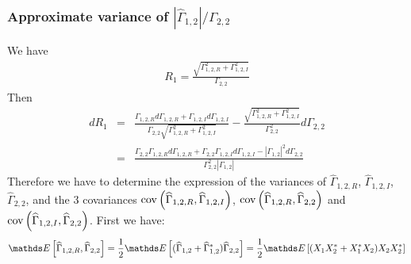 \subsubsection{Approximate variance of $|\hat\Gamma_{1,2}|/\Gamma_{2,2}$}
We have
\begin{eqnarray*}
 R_{1}=\frac{\sqrt{\Gamma_{1,2,R}^{2}+\Gamma_{1,2,I}^{2}}}{\Gamma_{2,2}}
\end{eqnarray*}
Then
\begin{eqnarray*}
  dR_{1} &=&
 \frac{\Gamma_{1,2,R}d\Gamma_{1,2,R}+\Gamma_{1,2,I}d\Gamma_{1,2,I}}
      {\Gamma_{2,2}\sqrt{\Gamma_{1,2,R}^{2}+\Gamma_{1,2,I}^{2}}}
      -\frac{\sqrt{\Gamma_{1,2,R}^{2}+\Gamma_{1,2,I}^{2}}}{\Gamma_{2,2}^{2}}d\Gamma_{2,2}
 \\
 &=&
  \frac{\Gamma_{2,2}\Gamma_{1,2,R}d\Gamma_{1,2,R}+\Gamma_{2,2}\Gamma_{1,2,I}d\Gamma_{1,2,I}
   -|\Gamma_{1,2}|^{2}d\Gamma_{2,2}}
      {\Gamma_{2,2}^{2}|\Gamma_{1,2}|}
\end{eqnarray*}
Therefore we have to determine the expression of the variances of $\hat\Gamma_{1,2,R}$, $\hat\Gamma_{1,2,I}$, $\hat\Gamma_{2,2}$, and the 3 covariances $\mathrm{cov}\left( \widehat\Gamma_{1,2,R},\widehat\Gamma_{1,2,I} \right)$, $\mathrm{cov}\left( \widehat\Gamma_{1,2,R},\widehat\Gamma_{2,2} \right)$
and
$\mathrm{cov}\left( \widehat\Gamma_{1,2,I},\widehat\Gamma_{2,2} \right)$. First we have:
\begin{eqnarray*}
 \esp{\hat\Gamma_{1,2,R},\hat\Gamma_{2,2}}
 =
 \frac{1}{2}\esp{(\hat\Gamma_{1,2}+\hat\Gamma_{1,2}^{*})\hat\Gamma_{2,2}}
 =
 \frac{1}{2}\esp{(X_{1}X_{2}^{*}+X_{1}^{*}X_{2})X_{2}X_{2}^{*}}
\end{eqnarray*}

